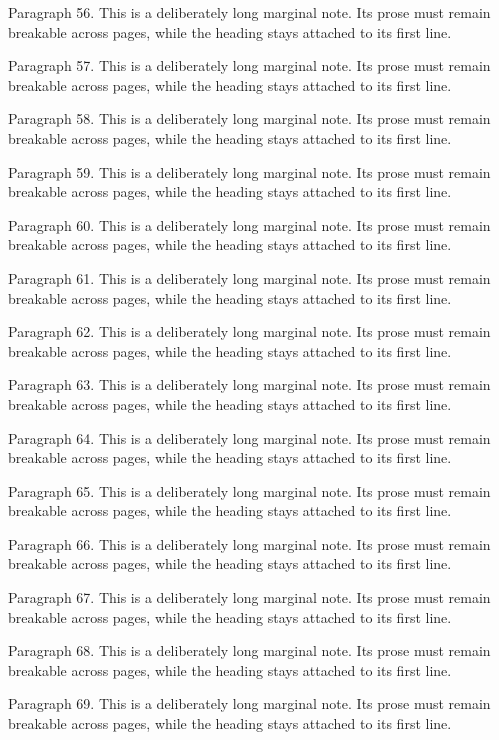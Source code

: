\documentclass[11pt]{article}
\begin{document}
{Paragraph 56. This is a deliberately long marginal note. Its prose must remain breakable across pages, while the heading stays attached to its first line.\par
Paragraph 57. This is a deliberately long marginal note. Its prose must remain breakable across pages, while the heading stays attached to its first line.\par
Paragraph 58. This is a deliberately long marginal note. Its prose must remain breakable across pages, while the heading stays attached to its first line.\par
Paragraph 59. This is a deliberately long marginal note. Its prose must remain breakable across pages, while the heading stays attached to its first line.\par
Paragraph 60. This is a deliberately long marginal note. Its prose must remain breakable across pages, while the heading stays attached to its first line.\par
Paragraph 61. This is a deliberately long marginal note. Its prose must remain breakable across pages, while the heading stays attached to its first line.\par
Paragraph 62. This is a deliberately long marginal note. Its prose must remain breakable across pages, while the heading stays attached to its first line.\par
Paragraph 63. This is a deliberately long marginal note. Its prose must remain breakable across pages, while the heading stays attached to its first line.\par
Paragraph 64. This is a deliberately long marginal note. Its prose must remain breakable across pages, while the heading stays attached to its first line.\par
Paragraph 65. This is a deliberately long marginal note. Its prose must remain breakable across pages, while the heading stays attached to its first line.\par
Paragraph 66. This is a deliberately long marginal note. Its prose must remain breakable across pages, while the heading stays attached to its first line.\par
Paragraph 67. This is a deliberately long marginal note. Its prose must remain breakable across pages, while the heading stays attached to its first line.\par
Paragraph 68. This is a deliberately long marginal note. Its prose must remain breakable across pages, while the heading stays attached to its first line.\par
Paragraph 69. This is a deliberately long marginal note. Its prose must remain breakable across pages, while the heading stays attached to its first line.\par
}
\end{document}
